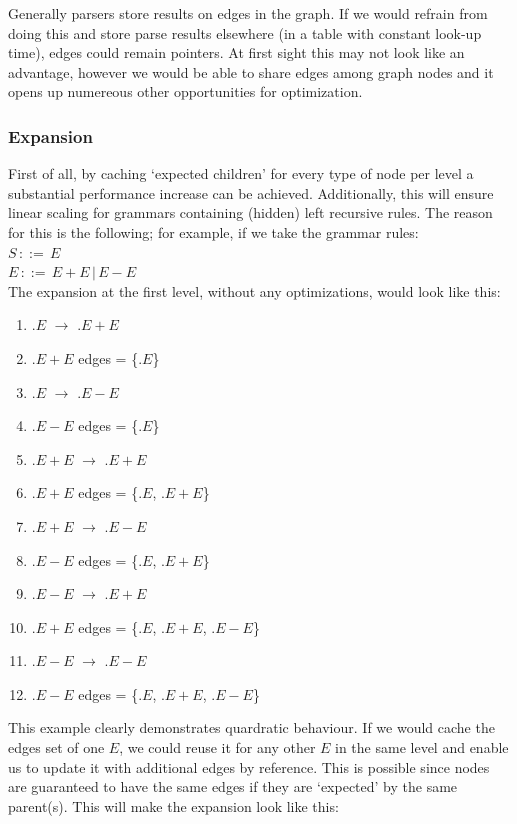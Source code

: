 \documentclass[a4paper,10pt]{article}
\begin{document}
Generally parsers store results on edges in the graph. If we would refrain from doing this and store parse results elsewhere (in a table with constant look-up time), edges could remain pointers. At first sight this may not look like an advantage, however we would be able to share edges among graph nodes and it opens up numereous other opportunities for optimization.

\subsubsection{Expansion}
\label{subsec:nodeExpansionOptimization}
First of all, by caching `expected children' for every type of node per level a substantial performance increase can be achieved. Additionally, this will ensure linear scaling for grammars containing (hidden) left recursive rules. The reason for this is the following; for example, if we take the grammar rules:\\
$S\,::=\,E$\\
$E\,::=\,E + E\,|\,E - E$\\
The expansion at the first level, without any optimizations, would look like this:
\begin{enumerate}
 \setlength{\itemsep}{0pt}
 \setlength{\parskip}{0pt}
 \setlength{\parsep}{0pt}
 
 \item $.E$ $\rightarrow$ $.E+E$
 \item $.E+E$ edges = \{$.E$\}
 \item $.E$ $\rightarrow$ $.E-E$
 \item $.E-E$ edges = \{$.E$\}
 \item $.E+E$ $\rightarrow$ $.E+E$
 \item $.E+E$ edges = \{$.E$, $.E+E$\}
 \item $.E+E$ $\rightarrow$ $.E-E$
 \item $.E-E$ edges = \{$.E$, $.E+E$\}
 \item $.E-E$ $\rightarrow$ $.E+E$
 \item $.E+E$ edges = \{$.E$, $.E+E$, $.E-E$\}
 \item $.E-E$ $\rightarrow$ $.E-E$
 \item $.E-E$ edges = \{$.E$, $.E+E$, $.E-E$\}
\end{enumerate}
This example clearly demonstrates quardratic behaviour. If we would cache the edges set of one $E$, we could reuse it for any other $E$ in the same level and enable us to update it with additional edges by reference. This is possible since nodes are guaranteed to have the same edges if they are `expected' by the same parent(s). This will make the expansion look like this:
\end{document}
